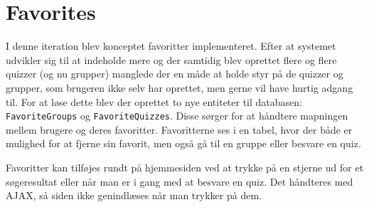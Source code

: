 \section{Favorites}
I denne iteration blev konceptet favoritter implementeret. Efter at systemet udvikler sig til at indeholde mere og der samtidig blev oprettet flere og flere quizzer (og nu grupper) manglede der en måde at holde styr på de quizzer og grupper, som brugeren ikke selv har oprettet, men gerne vil have hurtig adgang til. For at løse dette blev der oprettet to nye entiteter til databasen: \verb+FavoriteGroups+ og \verb+FavoriteQuizzes+. Disse sørger for at håndtere mapningen mellem brugere og deres favoritter. Favoritterne ses i en tabel, hvor der både er mulighed for at fjerne sin favorit, men også gå til en gruppe eller besvare en quiz.

Favoritter kan tilføjes rundt på hjemmesiden ved at trykke på en stjerne ud for et søgeresultat eller når man er i gang med at besvare en quiz. Det håndteres med AJAX, så siden ikke genindlæses når man trykker på dem.